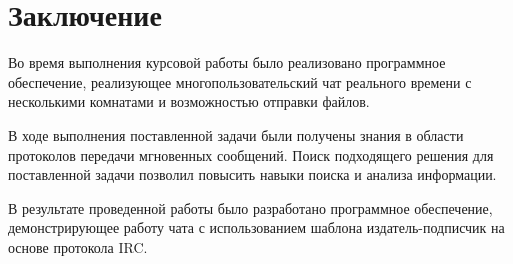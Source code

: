 \chapter*{Заключение}

Во время выполнения курсовой работы было реализовано программное обеспечение, реализующее многопользовательский чат реального времени с несколькими комнатами и возможностью отправки файлов.

В ходе выполнения поставленной задачи были получены знания в области протоколов передачи мгновенных сообщений. Поиск подходящего решения для поставленной задачи позволил повысить навыки поиска и анализа информации.

В результате проведенной работы было разработано программное обеспечение, демонстрирующее работу чата с использованием шаблона издатель-подписчик на основе протокола IRC.

